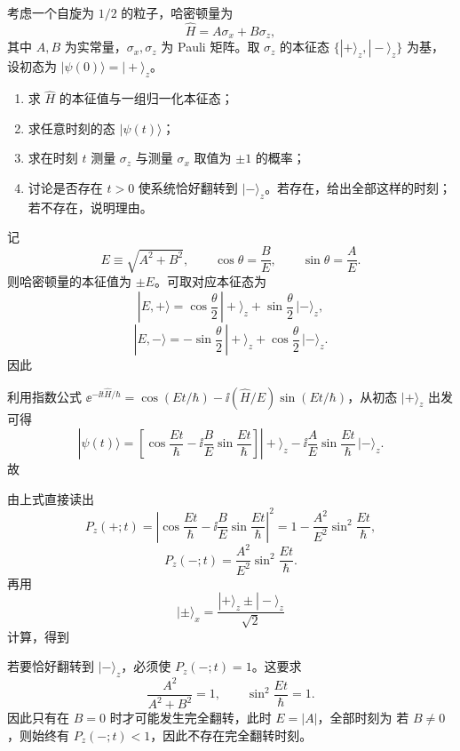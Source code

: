 \begin{question}
考虑一个自旋为 $1/2$ 的粒子，哈密顿量为
\[
\hat H=A\sigma_x+B\sigma_z,
\]
其中 $A,B$ 为实常量，$\sigma_x,\sigma_z$ 为 Pauli 矩阵。取 $\sigma_z$ 的本征态 $\{|+\rangle_z,|-\rangle_z\}$ 为基，设初态为 $|\psi(0)\rangle=|+\rangle_z$。

\begin{enumerate}[label=(\arabic*),leftmargin=2.5em]
  \item 求 $\hat H$ 的本征值与一组归一化本征态；
  \item 求任意时刻的态 $|\psi(t)\rangle$；
  \item 求在时刻 $t$ 测量 $\sigma_z$ 与测量 $\sigma_x$ 取值为 $\pm1$ 的概率；
  \item 讨论是否存在 $t>0$ 使系统恰好翻转到 $|-\rangle_z$。若存在，给出全部这样的时刻；若不存在，说明理由。
\end{enumerate}

\begin{solution}
记
\[
E\equiv \sqrt{A^2+B^2},\qquad \cos\theta=\frac{B}{E},\qquad \sin\theta=\frac{A}{E}.
\]
则哈密顿量的本征值为 $\pm E$。可取对应本征态为
\[
|E,+\rangle=\cos\frac\theta2\,|+\rangle_z+\sin\frac\theta2\,|-\rangle_z,
\]
\[
|E,-\rangle=-\sin\frac\theta2\,|+\rangle_z+\cos\frac\theta2\,|-\rangle_z.
\]
因此

利用指数公式 $\ee^{-\ii t\hat H/\hbar}=\cos(Et/\hbar)-\ii(\hat H/E)\sin(Et/\hbar)$，从初态 $|+\rangle_z$ 出发可得
\[
|\psi(t)\rangle=
\left[\cos\frac{Et}{\hbar}-\ii\frac{B}{E}\sin\frac{Et}{\hbar}\right]|+\rangle_z
-\ii\frac{A}{E}\sin\frac{Et}{\hbar}\,|-\rangle_z.
\]
故

由上式直接读出
\[
P_z(+;t)=\left|\cos\frac{Et}{\hbar}-\ii\frac{B}{E}\sin\frac{Et}{\hbar}\right|^2
=1-\frac{A^2}{E^2}\sin^2\frac{Et}{\hbar},
\]
\[
P_z(-;t)=\frac{A^2}{E^2}\sin^2\frac{Et}{\hbar}.
\]
再用
\[
|\pm\rangle_x=\frac{|+\rangle_z\pm |-\rangle_z}{\sqrt2}
\]
计算，得到

若要恰好翻转到 $|-\rangle_z$，必须使 $P_z(-;t)=1$。这要求
\[
\frac{A^2}{A^2+B^2}=1,
\qquad
\sin^2\frac{Et}{\hbar}=1.
\]
因此只有在 $B=0$ 时才可能发生完全翻转，此时 $E=|A|$，全部时刻为
若 $B\neq 0$，则始终有 $P_z(-;t)<1$，因此不存在完全翻转时刻。
\end{solution}
\end{question}

